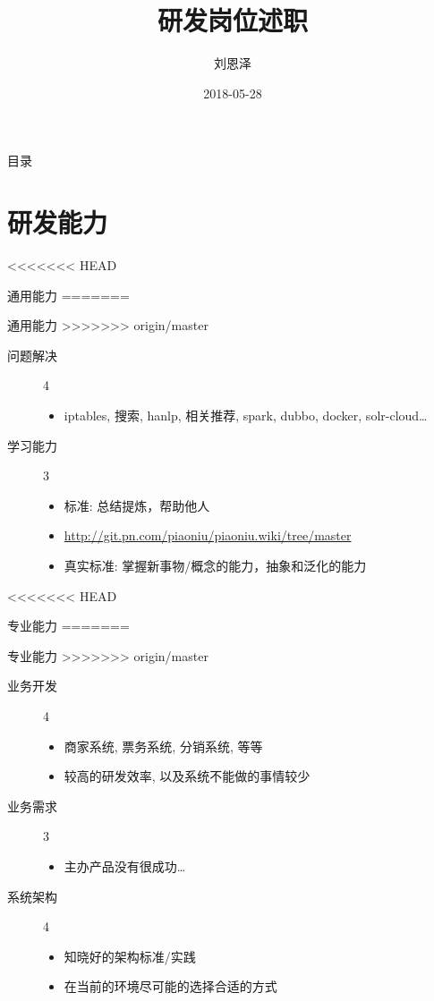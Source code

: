 \documentclass[presentation, bigger]{beamer}
\author{刘恩泽}
\date{2018-05-28}
\title{研发岗位述职}
\begin{document}
\maketitle
\begin{frame}{目录}
\tableofcontents
\end{frame}


\section{研发能力}
<<<<<<< HEAD
\label{sec:org56a8a25}
\begin{frame}[label={sec:org72f7fe4}]{通用能力}
=======
\label{sec:org0f6b115}
\begin{frame}[label={sec:org22c5dfb}]{通用能力}
>>>>>>> origin/master
\begin{description}
\item[{问题解决}] 4
\begin{itemize}
\item iptables, 搜索, hanlp, 相关推荐, spark, dubbo, docker, solr-cloud\ldots{}
\end{itemize}
\item[{学习能力}] 3
\begin{itemize}
\item 标准: 总结提炼，帮助他人
\item \url{http://git.pn.com/piaoniu/piaoniu.wiki/tree/master}
\item 真实标准: 掌握新事物/概念的能力，抽象和泛化的能力
\end{itemize}
\end{description}
\end{frame}

<<<<<<< HEAD
\begin{frame}[label={sec:orgf423d39}]{专业能力}
=======
\begin{frame}[label={sec:org3a8d937}]{专业能力}
>>>>>>> origin/master
\begin{description}
\item[{业务开发}] 4
\begin{itemize}
\item 商家系统, 票务系统, 分销系统, 等等
\item 较高的研发效率, 以及系统不能做的事情较少
\end{itemize}
\item[{业务需求}] 3
\begin{itemize}
\item 主办产品没有很成功\ldots{}
\end{itemize}
\item[{系统架构}] 4
\begin{itemize}
\item 知晓好的架构标准/实践
\item 在当前的环境尽可能的选择合适的方式
\end{itemize}
\end{description}
\end{frame}


\end{frame}
\end{frame}
\end{document}
